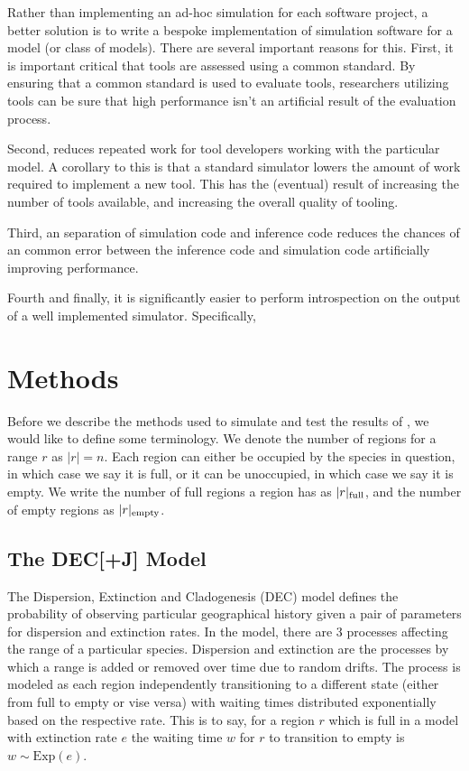 \documentclass{article}
\begin{document}
Rather than implementing an ad-hoc simulation for each software project, a
better solution is to write a bespoke implementation of simulation software for
a model (or class of models).
There are several important reasons for this.
First, it is important critical that tools are assessed using a common standard.
By ensuring that a common standard is used to evaluate tools, researchers
utilizing tools can be sure that high performance isn't an artificial result of
the evaluation process.

Second, reduces repeated work for tool developers working with the particular
model.
A corollary to this is that a standard simulator lowers the amount of work
required to implement a new tool.
This has the (eventual) result of increasing the number of tools available, and
increasing the overall quality of tooling.

Third, an separation of simulation code and inference code reduces the chances
of an common error between the inference code and simulation code artificially
improving performance.

Fourth and finally, it is significantly easier to perform introspection on the
output of a well implemented simulator. 
Specifically, 


\section{Methods}

Before we describe the methods used to simulate and test the results of
\bigrig{}, we would like to define some terminology. We denote the number of
regions for a range \( r \) as \( |r| = n\).
Each region can either be occupied by the species in question, in which case we
say it is full, or it can be unoccupied, in which case we say it is empty.
We write the number of full regions a region has as \( |r|_\text{full} \), and the
number of empty regions as \( |r|_\text{empty} \).

\subsection{The DEC[+J] Model} \label{sec:model}

The Dispersion, Extinction and Cladogenesis (DEC) model defines the probability
of observing particular geographical history given a pair of parameters for
dispersion and extinction rates.
In the model, there are 3 processes affecting the range of a particular
species.
Dispersion and extinction are the processes by which a range is added or
removed over time due to random drifts.
The process is modeled as each region independently transitioning to a
different state (either from full to empty or vise versa) with waiting times
distributed exponentially based on the respective rate.
This is to say, for a region \( r \) which is full in a model with extinction
rate \( e \) the waiting time \( w \) for \( r \) to transition to empty is \(
w \sim \text{Exp}(e) \).
\end{document}
